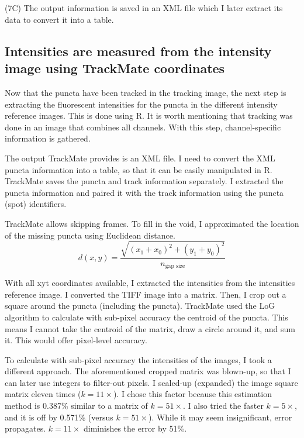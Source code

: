 \begin{centering}
{\\
\\
(7C) The output information is saved in an XML file which I later extract its data to convert it into a table.}
\label{m:4}
\end{centering}

\subsection{Intensities are measured from the intensity image using TrackMate coordinates}
Now that the puncta have been tracked in the tracking image, the next step is extracting the fluorescent intensities for the puncta in the different intensity reference images. This is done using R. It is worth mentioning that tracking was done in an image that combines all channels. With this step, channel-specific information is gathered.

The output TrackMate provides is an XML file. I need to convert the XML puncta information into a table, so that it can be easily manipulated in R. TrackMate saves the puncta and track information separately. I extracted the puncta information and paired it with the track information using the puncta (spot) identifiers.

TrackMate allows skipping frames. To fill in the void, I approximated the location of the missing puncta using Euclidean distance. \begin{equation}d(x, y) = \frac{\sqrt{(x_{1} + x_{0})^2 + (y_{1} + y_{0})^2}}{n_\text{gap size}}\end{equation}

With all xyt coordinates available, I extracted the intensities from the intensities reference image. I converted the TIFF image into a matrix. Then, I crop out a square around the puncta (including the puncta). TrackMate used the LoG algorithm to calculate with sub-pixel accuracy the centroid of the puncta. This means I cannot take the centroid of the matrix, draw a circle around it, and sum it. This would offer pixel-level accuracy.

To calculate with sub-pixel accuracy the intensities of the images, I took a different approach. The aforementioned cropped matrix was blown-up, so that I can later use integers to filter-out pixels. I scaled-up (expanded) the image square matrix eleven times ($k = 11 \times$). I chose this factor because this estimation method is 0.387\% similar to a matrix of $k = 51 \times$. I also tried the faster $k = 5 \times$, and it is off by 0.571\% (versus $k = 51 \times$). While it may seem insignificant, error propagates. $k = 11\times$ diminishes the error by 51\%.

